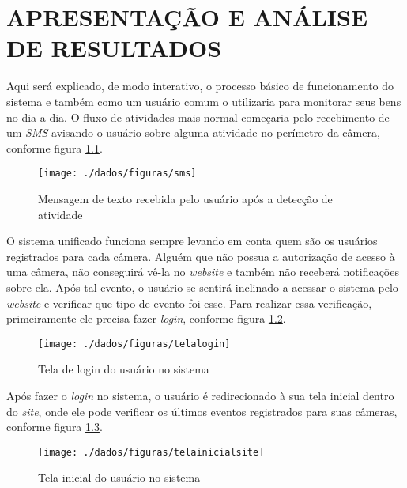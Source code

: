 
\chapter{APRESENTAÇÃO E ANÁLISE DE RESULTADOS}

Aqui será explicado, de modo interativo, o processo básico de funcionamento do sistema e também como um usuário comum o utilizaria para monitorar seus bens no dia-a-dia. O fluxo de atividades mais normal começaria pelo recebimento de um \textit{SMS} avisando o usuário sobre alguma atividade no perímetro da câmera, conforme figura \ref{fig:figura-sms}.

\begin{figure}[H]
    \centering
    \texttt{[image: ./dados/figuras/sms]}
    \caption{Mensagem de texto recebida pelo usuário após a detecção de atividade}
    \label{fig:figura-sms}
\end{figure}

O sistema unificado funciona sempre levando em conta quem são os usuários registrados para cada câmera. Alguém que não possua a autorização de acesso à uma câmera, não conseguirá vê-la no \textit{website} e também não receberá notificações sobre ela. Após tal evento, o usuário se sentirá inclinado a acessar o sistema pelo \textit{website} e verificar que tipo de evento foi esse. Para realizar essa verificação, primeiramente ele precisa fazer \textit{login}, conforme figura \ref{fig:figura-login}.

\begin{figure}[H]
    \centering
    \texttt{[image: ./dados/figuras/telalogin]}
    \caption{Tela de login do usuário no sistema}
    \label{fig:figura-login}
\end{figure}

Após fazer o \textit{login} no sistema, o usuário é redirecionado à sua tela inicial dentro do \textit{site}, onde ele pode verificar os últimos eventos registrados para suas câmeras, conforme figura \ref{fig:figura-telasite}.

\begin{figure}[H]
    \centering
    \texttt{[image: ./dados/figuras/telainicialsite]}
    \caption{Tela inicial do usuário no sistema}
    \label{fig:figura-telasite}
\end{figure}

